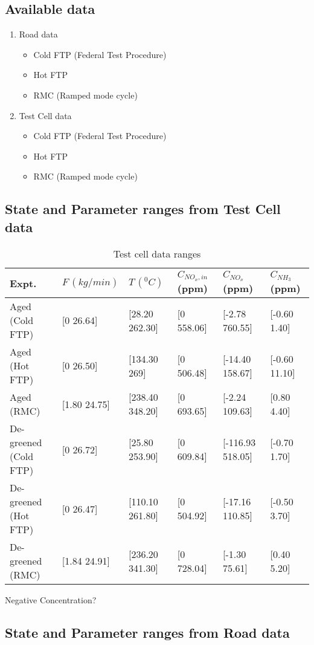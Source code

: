 \subsection{Available data}
\begin{enumerate}
    \item Road data
    \begin{itemize}
        \item Cold FTP (Federal Test Procedure)
        \item Hot FTP
        \item RMC (Ramped mode cycle)
    \end{itemize}
    \item Test Cell data
    \begin{itemize}
        \item Cold FTP (Federal Test Procedure)
        \item Hot FTP
        \item RMC (Ramped mode cycle)
    \end{itemize}

\end{enumerate}


\subsection{State and Parameter ranges from Test Cell data}

\begin{table}[H]
    \centering
    \begin{tabular}{l l l l l l}
        \hline \hline
Expt. & $F\,(kg/min)$ & $T\, (^0 C)$ & $C_{NO_x, in}$ (ppm) & $ C_{NO_x}$ (ppm) & $C_{NH_3}$ (ppm) \\\hline \hline
Aged (Cold FTP) & [0 26.64] & [28.20 262.30] & [0 558.06] & [-2.78
760.55] & [-0.60 1.40] \\
Aged (Hot FTP) & [0 26.50] & [134.30 269] & [0 506.48] & [-14.40
158.67] & [-0.60 11.10]\\
Aged (RMC) & [1.80 24.75] & [238.40 348.20] & [0 693.65] & [-2.24
109.63] & [0.80 4.40]\\
De-greened (Cold FTP) & [0 26.72] & [25.80 253.90] & [0 609.84] &
[-116.93 518.05] & [-0.70 1.70] \\
De-greened (Hot FTP) & [0 26.47] & [110.10 261.80] & [0 504.92] &
[-17.16 110.85] & [-0.50 3.70]\\
De-greened (RMC) & [1.84 24.91] & [236.20 341.30] & [0 728.04] &
[-1.30 75.61] & [0.40 5.20] \\
\hline \hline
    \end{tabular}
    \caption{Test cell data ranges}
\end{table}
 Negative Concentration?
\subsection{State and Parameter ranges from Road data}

